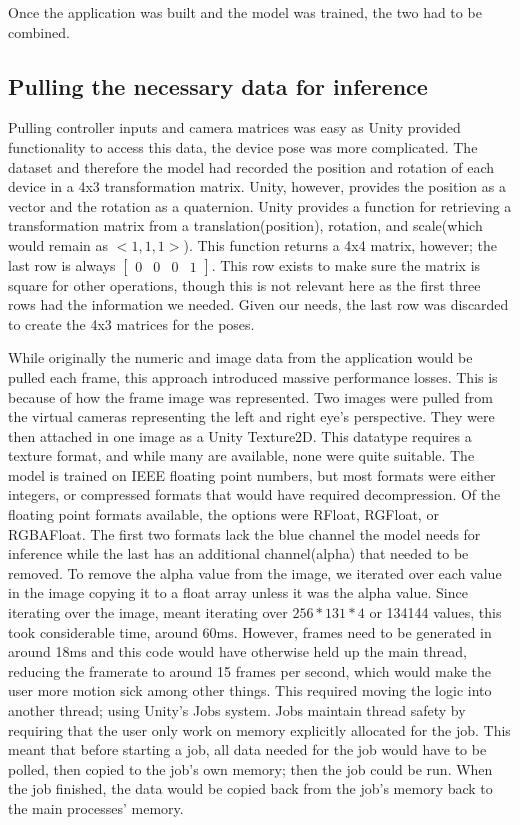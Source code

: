 Once the application was built and the model was trained, the two had to be combined.


\subsection{Pulling the necessary data for inference}
\label{subsec: pulling_data}

Pulling controller inputs and camera matrices was easy as Unity provided functionality to access this data, the device pose was more complicated.
The dataset and therefore the model had recorded the position and rotation of each device in a 4x3 transformation matrix.
Unity, however, provides the position as a vector and the rotation as a quaternion\cite{voight2021quaternion}.
Unity provides a function for retrieving a transformation matrix from a translation(position), rotation, and scale(which would remain as $<1, 1, 1>$).
This function returns a 4x4 matrix, however; the last row is always $\left[\begin{matrix} 0 & 0 & 0 & 1 \end{matrix}\right]$.
This row exists to make sure the matrix is square for other operations, though this is not relevant here as the first three rows had the information we needed.
Given our needs, the last row was discarded to create the 4x3 matrices for the poses.

While originally the numeric and image data from the application would be pulled each frame, this approach introduced massive performance losses.
This is because of how the frame image was represented.
Two images were pulled from the virtual cameras representing the left and right eye's perspective.
They were then attached in one image as a Unity Texture2D\@.
This datatype requires a texture format, and while many are available, none were quite suitable.
The model is trained on IEEE floating point numbers, but most formats were either integers, or compressed formats that would have required decompression.
Of the floating point formats available, the options were RFloat, RGFloat, or RGBAFloat.
The first two formats lack the blue channel the model needs for inference while the last has an additional channel(alpha) that needed to be removed.
To remove the alpha value from the image, we iterated over each value in the image copying it to a float array unless it was the alpha value.
Since iterating over the image, meant iterating over $256*131*4$ or 134144 values, this took considerable time, around 60ms.
However, frames need to be generated in around 18ms and this code would have otherwise held up the main thread, reducing the framerate to around 15 frames per second, which would make the user more motion sick among other things.
This required moving the logic into another thread; using Unity's Jobs system.
Jobs maintain thread safety by requiring that the user only work on memory explicitly allocated for the job.
This meant that before starting a job, all data needed for the job would have to be polled, then copied to the job's own memory; then the job could be run.
When the job finished, the data would be copied back from the job's memory back to the main processes' memory.

